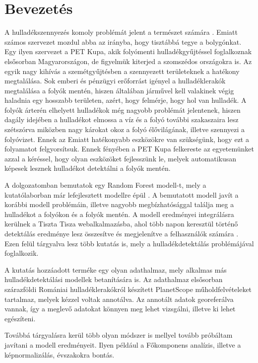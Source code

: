 \chapter{Bevezetés}
\label{ch:intro}

A hulladékszennyezés komoly problémát jelent a természet számára \cite{kibria2023PlasticWaste}. Emiatt számos szervezet mozdul abba az irányba, hogy tisztábbá tegye a bolygónkat. Egy ilyen szervezet a PET Kupa, akik folyómenti hulladékgyűjtéssel foglalkoznak elsősorban Magyarországon, de figyelmük kiterjed a szomszédos országokra is. Az egyik nagy kihívás a szemétgyűjtésben a szennyezett területeknek a hatékony megtalálása. Sok emberi és pénzügyi erőforrást igényel a hulladéklerakók megtalálása a folyók mentén, hiszen általában járművel kell valakinek végig haladnia egy hosszabb területen, azért, hogy felmérje, hogy hol van hulladék. A folyók árterén elhelyett hulladékok még nagyobb problémát jelentenek, hiszen dagály idejében a hulladékot elmossa a víz és a folyó további szakaszaira lesz szétszórva miközben nagy károkat okoz a folyó élővilágának, illetve szennyezi a folyóvizet. Ennek az  Emiatt hatékonyabb eszközökre van szükségünk, hogy ezt a folyamatot felgyorsítsuk. Ennek fényében a PET Kupa felkereste az egyetemünket azzal a kéréssel, hogy olyan eszközöket fejlesszünk le, melyek automatikusan képesek lesznek hulladékot detektálni a folyók mentén.

A dolgozatomban bemutatok egy Random Forest modell-t\cite{breiman2001}, mely a kutatólaborban már lefejlesztett modellre épül \cite{magyar2023}. A bemutatott modell javít a korábbi modell problémáin, illetve nagyobb megbízhatósággal találja meg a hulladékot a folyókon és a folyók mentén. A modell eredményei integrálásra kerülnek a Tiszta Tisza webalkalmazásba, ahol több napon keresztül történő detektálás eredménye lesz összesítve és megjelenítve a felhasználók számára . Ezen felül tárgyalva lesz több kutatás is, mely a hulladékdetektálás problémájával foglalkozik.

A kutatás hozzáadott terméke egy olyan adathalmaz, mely alkalmas más hulladékdetektálási modellek betanítására is. Az adathalmaz elsősorban szárazföldi Romániai hulladéklerakókról készített PlanetScope műholdfelvételeket tartalmaz, melyek kézzel voltak annotálva. Az annotált adatok georeferálva vannak, így a meglevő adatokat könnyen meg lehet vizsgálni, illetve ki lehet egészíteni. 

Továbbá tárgyalásra kerül több olyan módszer is mellyel tovább próbáltam javítani a modell eredményeit. Ilyen például a Főkomponens analízis, illetve a képnormalizálás, évszakokra bontás.

